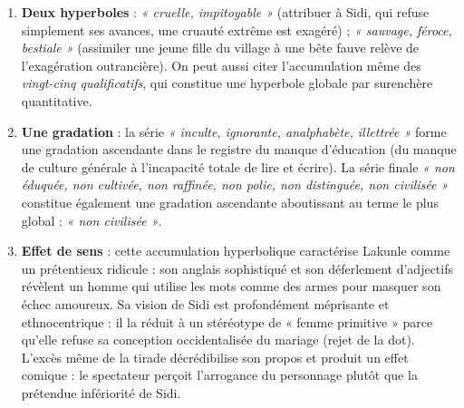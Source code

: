 \documentclass[11pt]{article}
\begin{document}
\begin{corrige}
\begin{enumerate}
    \item \textbf{Deux hyperboles} : \emph{« cruelle, impitoyable »} (attribuer à Sidi, qui refuse simplement ses avances, une cruauté extrême est exagéré) ; \emph{« sauvage, féroce, bestiale »} (assimiler une jeune fille du village à une bête fauve relève de l'exagération outrancière). On peut aussi citer l'accumulation même des \emph{vingt-cinq qualificatifs}, qui constitue une hyperbole globale par surenchère quantitative.
    \item \textbf{Une gradation} : la série \emph{« inculte, ignorante, analphabète, illettrée »} forme une gradation ascendante dans le registre du manque d'éducation (du manque de culture générale à l'incapacité totale de lire et écrire). La série finale \emph{« non éduquée, non cultivée, non raffinée, non polie, non distinguée, non civilisée »} constitue également une gradation ascendante aboutissant au terme le plus global : \emph{« non civilisée »}.
    \item \textbf{Effet de sens} : cette accumulation hyperbolique caractérise Lakunle comme un prétentieux ridicule : son anglais sophistiqué et son déferlement d'adjectifs révèlent un homme qui utilise les mots comme des armes pour masquer son échec amoureux. Sa vision de Sidi est profondément méprisante et ethnocentrique : il la réduit à un stéréotype de « femme primitive » parce qu'elle refuse sa conception occidentalisée du mariage (rejet de la dot). L'excès même de la tirade décrédibilise son propos et produit un effet comique : le spectateur perçoit l'arrogance du personnage plutôt que la prétendue infériorité de Sidi.
\end{enumerate}
\end{corrige}
\end{document}

